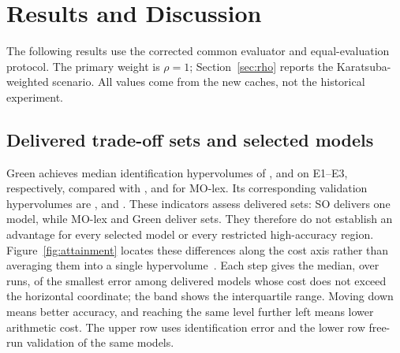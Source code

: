 \section{Results and Discussion}\label{sec:results}
The following results use the corrected common evaluator and equal-evaluation protocol. The primary weight is $\rho=1$; Section~\ref{sec:rho} reports the Karatsuba-weighted scenario. All values come from the new caches, not the historical experiment.

\subsection{Delivered trade-off sets and selected models}
Green achieves median identification hypervolumes of \EBGreenHVid, \ECGreenHVid{} and \EDGreenHVid{} on E1--E3, respectively, compared with \EBLexHVid, \ECLexHVid{} and \EDLexHVid{} for MO-lex. Its corresponding validation hypervolumes are \EBGreenHVval, \ECGreenHVval{} and \EDGreenHVval. These indicators assess delivered sets: SO delivers one model, while MO-lex and Green deliver sets. They therefore do not establish an advantage for every selected model or every restricted high-accuracy region. Figure~\ref{fig:attainment} locates these differences along the cost axis rather than averaging them into a single hypervolume~\cite{FF1996}. Each step gives the median, over runs, of the smallest error among delivered models whose cost does not exceed the horizontal coordinate; the band shows the interquartile range. Moving down means better accuracy, and reaching the same level further left means lower arithmetic cost. The upper row uses identification error and the lower row free-run validation of the same models.

